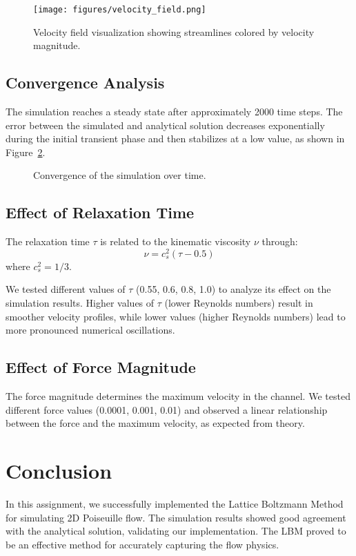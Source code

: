 \documentclass[12pt]{article}
\begin{document}
\begin{figure}[H]
\centering
\texttt{[image: figures/velocity\_field.png]}
\caption{Velocity field visualization showing streamlines colored by velocity magnitude.}
\label{fig:velocity_field}
\end{figure}

\subsection{Convergence Analysis}
The simulation reaches a steady state after approximately 2000 time steps. The error between the simulated and analytical solution decreases exponentially during the initial transient phase and then stabilizes at a low value, as shown in Figure~\ref{fig:convergence}.

\begin{figure}[H]
\centering
\caption{Convergence of the simulation over time.}
\label{fig:convergence}
\end{figure}

\subsection{Effect of Relaxation Time}
The relaxation time $\tau$ is related to the kinematic viscosity $\nu$ through:
\begin{equation}
\nu = c_s^2 (\tau - 0.5)
\end{equation}
where $c_s^2 = 1/3$.

We tested different values of $\tau$ (0.55, 0.6, 0.8, 1.0) to analyze its effect on the simulation results. Higher values of $\tau$ (lower Reynolds numbers) result in smoother velocity profiles, while lower values (higher Reynolds numbers) lead to more pronounced numerical oscillations.

\subsection{Effect of Force Magnitude}
The force magnitude determines the maximum velocity in the channel. We tested different force values (0.0001, 0.001, 0.01) and observed a linear relationship between the force and the maximum velocity, as expected from theory.

\section{Conclusion}
In this assignment, we successfully implemented the Lattice Boltzmann Method for simulating 2D Poiseuille flow. The simulation results showed good agreement with the analytical solution, validating our implementation. The LBM proved to be an effective method for accurately capturing the flow physics.
\end{document}
